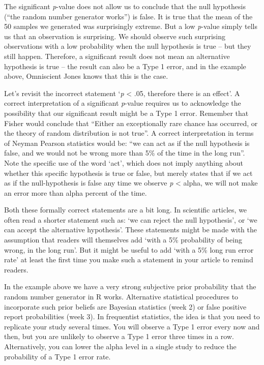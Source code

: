 \documentclass[
]{krantz}
\begin{document}
The significant \emph{p}-value does not allow us to conclude that the null hypothesis (``the random number generator works'') is false. It is true that the mean of the 50 samples we generated was surprisingly extreme. But a low \emph{p}-value simply tells us that an observation is surprising. We should observe such surprising observations with a low probability when the null hypothesis is true -- but they still happen. Therefore, a significant result does not mean an alternative hypothesis is true -- the result can also be a Type 1 error, and in the example above, Omniscient Jones knows that this is the case.

Let's revisit the incorrect statement `\emph{p} \textless{} .05, therefore there is an effect'. A correct interpretation of a significant \emph{p}-value requires us to acknowledge the possibility that our significant result might be a Type 1 error. Remember that Fisher would conclude that ``Either an exceptionally rare chance has occurred, or the theory of random distribution is not true''. A correct interpretation in terms of Neyman Pearson statistics would be: ``we can act as if the null hypothesis is false, and we would not be wrong more than 5\% of the time in the long run''. Note the specific use of the word `act', which does not imply anything about whether this specific hypothesis is true or false, but merely states that if we act as if the null-hypothesis is false any time we observe \emph{p} \textless{} alpha, we will not make an error more than alpha percent of the time.

Both these formally correct statements are a bit long. In scientific articles, we often read a shorter statement such as: `we can reject the null hypothesis', or `we can accept the alternative hypothesis'. These statements might be made with the assumption that readers will themselves add `with a 5\% probability of being wrong, in the long run'. But it might be useful to add `with a 5\% long run error rate' at least the first time you make such a statement in your article to remind readers.

In the example above we have a very strong subjective prior probability that the random number generator in R works. Alternative statistical procedures to incorporate such prior beliefs are Bayesian statistics (week 2) or false positive report probabilities (week 3). In frequentist statistics, the idea is that you need to replicate your study several times. You will observe a Type 1 error every now and then, but you are unlikely to observe a Type 1 error three times in a row. Alternatively, you can lower the alpha level in a single study to reduce the probability of a Type 1 error rate.
\end{document}
